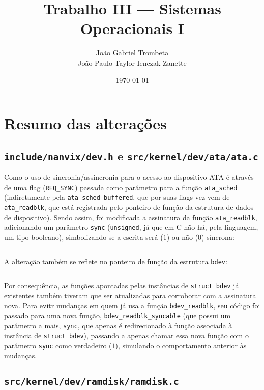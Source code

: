 \documentclass{article}
\title{Trabalho III --- Sistemas Operacionais I}
\author{João Gabriel Trombeta\\
        João Paulo Taylor Ienczak Zanette}
\date{\today}
\begin{document}
\maketitle

\section{Resumo das alterações}

\subsection{\texttt{include/nanvix/dev.h} e \texttt{src/kernel/dev/ata/ata.c}}

Como o uso de sincronia/assincronia para o acesso ao dispositivo ATA é através
de uma flag (\texttt{REQ\_SYNC}) passada como parâmetro para a função
\texttt{ata\_sched} (indiretamente pela \texttt{ata\_sched\_buffered}, que por
suas flags vez vem de \texttt{ata\_readblk}, que está registrada pelo ponteiro
de função da estrutura de dados de dispositivo). Sendo assim, foi modificada a
assinatura da função \texttt{ata\_readblk}, adicionando um parâmetro
\texttt{sync} (\texttt{unsigned}, já que em C não há, pela linguagem, um tipo
booleano), simbolizando se a escrita será ($1$) ou não ($0$) síncrona:

\inputminted[firstline=647, lastline=647]{c}{../../src/kernel/dev/ata/ata.c}

A alteração também se reflete no ponteiro de função da estrutura \texttt{bdev}:

\inputminted[firstline=132, lastline=132]{c}{../../include/nanvix/dev.h}

Por consequência, as funções apontadas pelas instâncias de \texttt{struct bdev}
já existentes também tiveram que ser atualizadas para corroborar com a
assinatura nova. Para evitr mudanças em quem já usa a função
\texttt{bdev\_readblk}, seu código foi passado para uma nova função,
\texttt{bdev\_readblk\_syncable} (que possui um parâmetro a mais,
\texttt{sync}, que apenas é redirecionado à função associada à instância de
\texttt{struct bdev}), passando a apenas chamar essa nova função com o
parâmetro \texttt{sync} como verdadeiro ($1$), simulando o comportamento
anterior às mudanças.

\subsection{\texttt{src/kernel/dev/ramdisk/ramdisk.c}}
\end{document}
